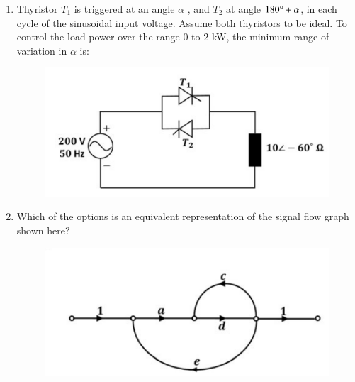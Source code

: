 \documentclass[journal,12pt,onecolumn]{IEEEtran}
\theoremstyle{remark}
\begin{document}
\begin{enumerate}[start=1, label=Q.\arabic*]
\item Thyristor $T_{1}$ is triggered at an angle $\alpha$ , and $T_{2}$ at angle $180\degree+\alpha$, in each cycle of the sinusoidal input voltage. Assume both thyristors to be ideal. To control the load power over the range $0$ to $2$ kW, the minimum range of variation in $\alpha$ is:
\begin{figure}[H]
    \centering
    \includegraphics[width=0.5\columnwidth]{Figures/aq12.png}
    \caption{}
\end{figure}
    \begin{enumerate}
    \end{enumerate}

\hfill{}

\item Which of the options is an equivalent representation of the signal flow graph shown here?
\begin{figure}[H]
    \centering
    \includegraphics[width=0.6\columnwidth]{Figures/aq13.png}
    \caption{}
\end{figure}
    \begin{enumerate}
    

\end{enumerate}
\end{enumerate}
\end{document}
